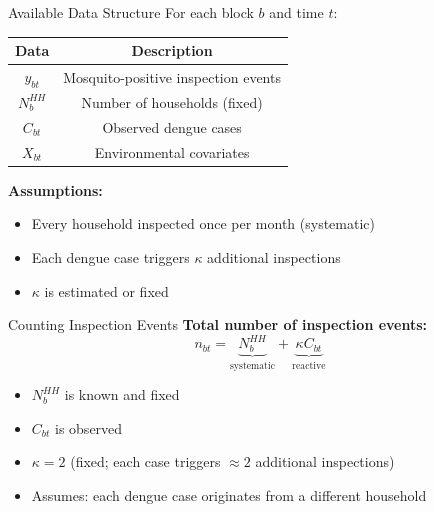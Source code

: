 \documentclass[aspectratio=169]{beamer}
\begin{document}
\begin{frame}{Available Data Structure}
  For each block $b$ and time $t$:
  
  \begin{center}
    \begin{tabular}{|c|c|}
      \hline
      \textbf{Data} & \textbf{Description} \\
      \hline
      $y_{bt}$ & Mosquito-positive inspection events \\
      $N_b^{HH}$ & Number of households (fixed) \\
      $C_{bt}$ & Observed dengue cases \\
      $X_{bt}$ & Environmental covariates \\
      \hline
    \end{tabular}
  \end{center}
  
  \vspace{1cm}
  
  \textbf{Assumptions:}
  \begin{itemize}
    \item Every household inspected once per month (systematic)
    \item Each dengue case triggers $\kappa$ additional inspections
    \item $\kappa$ is estimated or fixed
  \end{itemize}
\end{frame}

\begin{frame}{Counting Inspection Events}
  \textbf{Total number of inspection events:}
  \begin{equation*}
    n_{bt} = \underbrace{N_b^{HH}}_{\text{systematic}} + \underbrace{\kappa C_{bt}}_{\text{reactive}}
  \end{equation*}
  
  \vspace{1cm}
  
  \begin{itemize}
    \item $N_b^{HH}$ is known and fixed
    \item $C_{bt}$ is observed
    \item $\kappa = 2$ (fixed; each case triggers $\approx 2$ additional inspections)
    \item Assumes: each dengue case originates from a different household
  \end{itemize}
\end{frame}
\end{document}

